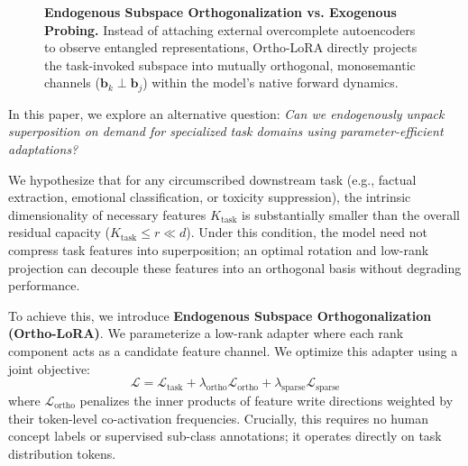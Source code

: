 \documentclass[10pt,twocolumn,letterpaper]{article}
\begin{document}
\begin{figure}[t!]
{
    }
    \caption{\textbf{Endogenous Subspace Orthogonalization vs. Exogenous Probing.} Instead of attaching external overcomplete autoencoders to observe entangled representations, Ortho-LoRA directly projects the task-invoked subspace into mutually orthogonal, monosemantic channels ($\bm{b}_k \perp \bm{b}_j$) within the model's native forward dynamics.}
    \label{fig:teaser}
\end{figure}

In this paper, we explore an alternative question: \textit{Can we endogenously unpack superposition on demand for specialized task domains using parameter-efficient adaptations?}

We hypothesize that for any circumscribed downstream task (e.g., factual extraction, emotional classification, or toxicity suppression), the intrinsic dimensionality of necessary features $K_{\text{task}}$ is substantially smaller than the overall residual capacity ($K_{\text{task}} \le r \ll d$). Under this condition, the model need not compress task features into superposition; an optimal rotation and low-rank projection can decouple these features into an orthogonal basis without degrading performance.

To achieve this, we introduce \textbf{Endogenous Subspace Orthogonalization (Ortho-LoRA)}. We parameterize a low-rank adapter where each rank component acts as a candidate feature channel. We optimize this adapter using a joint objective:
\begin{equation}
    \mathcal{L} = \mathcal{L}_{\text{task}} + \lambda_{\text{ortho}} \mathcal{L}_{\text{ortho}} + \lambda_{\text{sparse}} \mathcal{L}_{\text{sparse}}
\end{equation}
where $\mathcal{L}_{\text{ortho}}$ penalizes the inner products of feature write directions weighted by their token-level co-activation frequencies. Crucially, this requires no human concept labels or supervised sub-class annotations; it operates directly on task distribution tokens.
\end{document}
